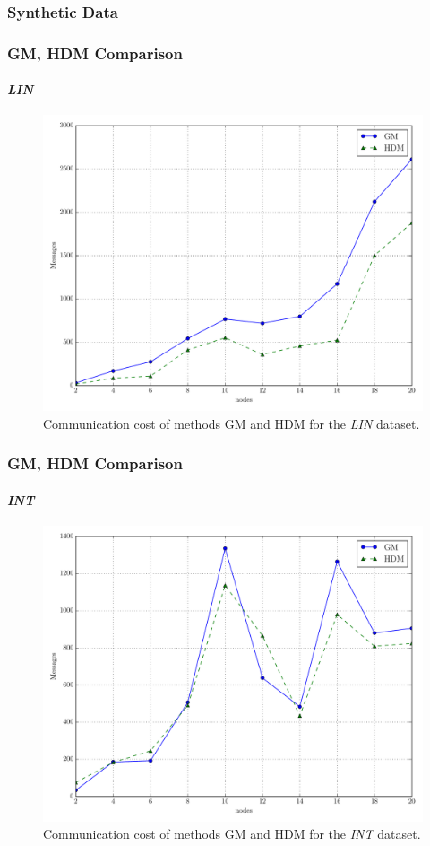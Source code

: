 \documentclass[hyperref={pdfpagelabels=false}]{beamer}
\begin{document}
\subsubsection*{Synthetic Data}
\begin{frame} \frametitle{GM, HDM Comparison}\framesubtitle{\emph{LIN}}
\begin{figure}
\vspace{-0.5cm}
\centering
\includegraphics[scale=0.3]{../img/main_msg_linear_nodes.pdf}
  \caption{Communication cost of methods GM and HDM for the \emph{LIN} dataset.}
\end{figure}
\end{frame}

\begin{frame} \frametitle{GM, HDM Comparison}\framesubtitle{\emph{INT}}
\begin{figure}
\vspace{-0.5cm}
\centering
\includegraphics[scale=0.3]{../img/main_msg_interweaving_nodes.pdf}
  \caption{Communication cost of methods GM and HDM for the \emph{INT} dataset.}
\end{figure}
\end{frame}
\end{document}
